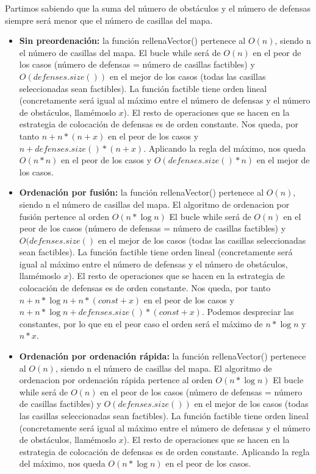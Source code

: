 Partimos sabiendo que la suma del n\'umero de obst\'aculos y el n\'umero de defensas siempre ser\'a menor que el n\'umero de casillas del mapa.

\begin{itemize}
    \item \textbf{Sin preordenaci\'on:} la funci\'on rellenaVector() pertenece al $O(n)$, siendo n el n\'umero de casillas del mapa. 
    El bucle while ser\'a de $O(n)$ en el peor de los casos (n\'umero de defensas = n\'umero de casillas factibles) y $O(defenses.size())$ en el mejor de los casos 
    (todas las casillas seleccionadas sean factibles). La funci\'on factible tiene orden lineal 
    (concretamente ser\'a igual al m\'aximo entre el n\'umero de defensas y el n\'umero de obst\'aculos, llam\'emoslo $x$).
    El resto de operaciones que se hacen en la estrategia de colocaci\'on de defensas es de orden constante. 
    Nos queda, por tanto $n + n*(n+x)$ en el peor de los casos y $n + defenses.size()*(n+x)$. Aplicando la regla del m\'aximo, nos queda $O(n*n)$ en el peor de los casos y 
    $O(defenses.size()*n)$ en el mejor de los casos. 
    
    \item \textbf{Ordenaci\'on por fusi\'on:} la funci\'on rellenaVector() pertenece al $O(n)$, siendo n el n\'umero de casillas del mapa. 
    El algoritmo de ordenacion por fusi\'on pertence al orden $O(n*\log n)$
    El bucle while ser\'a de $O(n)$ en el peor de los casos (n\'umero de defensas = n\'umero de casillas factibles) y 
    $O(defenses.size()$ en el mejor de los casos 
    (todas las casillas seleccionadas sean factibles). La funci\'on factible tiene orden lineal 
    (concretamente ser\'a igual al m\'aximo entre el n\'umero de defensas y el n\'umero de obst\'aculos, llam\'emoslo $x$).
    El resto de operaciones que se hacen en la estrategia de colocaci\'on de defensas es de orden constante. 
    Nos queda, por tanto $n + n*\log n + n*(const+x)$ en el peor de los casos y $n + n*\log n + defenses.size()*(const+x)$. Podemos despreciar las constantes, por lo que en el peor caso el orden será el máximo de $n*\log n$ y $n*x$.
    

    \item \textbf{Ordenaci\'on por ordenaci\'on r\'apida:} la funci\'on rellenaVector() pertenece al $O(n)$, siendo n el n\'umero de casillas del mapa. 
    El algoritmo de ordenacion por ordenaci\'on r\'apida pertence al orden $O(n*\log n)$
    El bucle while ser\'a de $O(n)$ en el peor de los casos (n\'umero de defensas = n\'umero de casillas factibles) y $O(defenses.size())$ en el mejor de los casos 
    (todas las casillas seleccionadas sean factibles). La funci\'on factible tiene orden lineal 
    (concretamente ser\'a igual al m\'aximo entre el n\'umero de defensas y el n\'umero de obst\'aculos, llam\'emoslo $x$).
    El resto de operaciones que se hacen en la estrategia de colocaci\'on de defensas es de orden constante. 
    Aplicando la regla del m\'aximo, nos queda $O(n*\log n)$ en el peor de los casos. 


\end{itemize}
